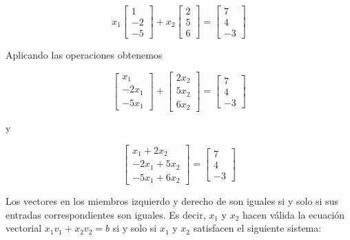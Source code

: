 \documentclass{article}
\begin{document}
\begin{equation*}
    x_1 \begin{bmatrix}
        1\\-2\\-5
    \end{bmatrix} 
    +x_2 \begin{bmatrix}
        2\\5\\6
    \end{bmatrix}
    = \begin{bmatrix}
        7\\4\\-3
    \end{bmatrix}
\end{equation*}

Aplicando las operaciones obtenemos

\begin{equation*}
    \begin{bmatrix}
        x_1\\-2x_1\\-5x_1
    \end{bmatrix} 
    +\begin{bmatrix}
        2x_2\\5x_2\\6x_2
    \end{bmatrix}
    = \begin{bmatrix}
        7\\4\\-3
    \end{bmatrix}
\end{equation*}

y 

\begin{equation*}
    \begin{bmatrix}
        x_1 + 2x_2\\-2x_1 + 5x_2 \\-5x_1 + 6x_2
    \end{bmatrix} 
    = \begin{bmatrix}
        7\\4\\-3
    \end{bmatrix}
\end{equation*}

Los vectores en los miembros izquierdo y derecho de son iguales si y solo si sus entradas correspondientes son iguales. Es decir, $x_1$ y $x_2$ hacen válida la ecuación vectorial $x_1\textbf{$v_1$} + x_2\textbf{$v_2$} = \textbf{$b$}$ si y solo si $x_1$ y $x_2$ satisfacen el siguiente sistema:
\end{document}
